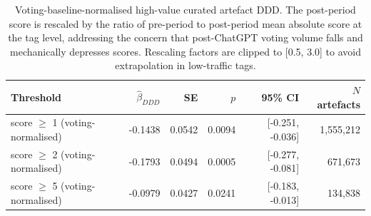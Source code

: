 \begin{table}[ht]
\centering
\caption{Voting-baseline-normalised high-value curated artefact DDD. The post-period score is rescaled by the ratio of pre-period to post-period mean absolute score at the tag level, addressing the concern that post-ChatGPT voting volume falls and mechanically depresses scores. Rescaling factors are clipped to [0.5, 3.0] to avoid extrapolation in low-traffic tags.}
\label{tab:voting_normalised_highvalue}
\small
\begin{tabular}{lrrrrr}
\toprule
Threshold & $\hat\beta_{DDD}$ & SE & $p$ & 95\% CI & $N$ artefacts \\
\midrule
score $\geq$ 1 (voting-normalised) & -0.1438 & 0.0542 & 0.0094 & [-0.251, -0.036] & 1,555,212 \\
score $\geq$ 2 (voting-normalised) & -0.1793 & 0.0494 & 0.0005 & [-0.277, -0.081] & 671,673 \\
score $\geq$ 5 (voting-normalised) & -0.0979 & 0.0427 & 0.0241 & [-0.183, -0.013] & 134,838 \\
\bottomrule
\end{tabular}
\end{table}
